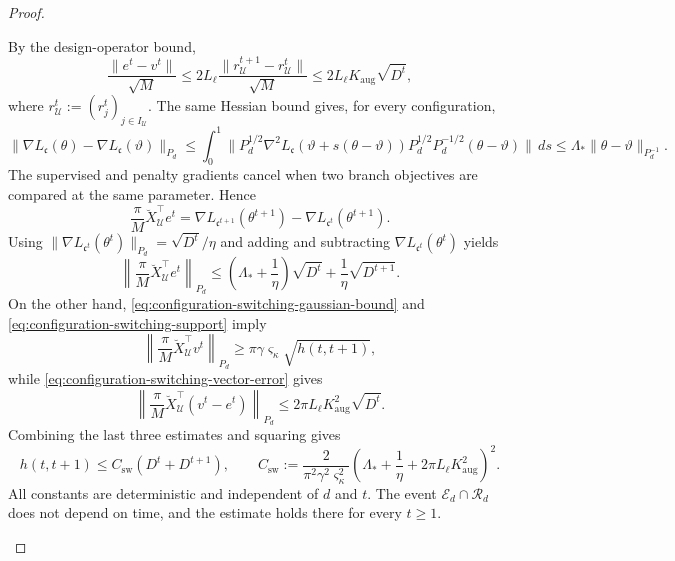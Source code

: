 \begin{proof}
\begin{itemize}[wide]
By the design-operator bound,
\begin{equation}
    \frac{\|e^t-v^t\|}{\sqrt M}
    \leq 2L_\ell
        \frac{\|r_{\mathcal U}^{t+1}-r_{\mathcal U}^t\|}{\sqrt M}
    \leq 2L_\ell K_{\mathrm{aug}}\sqrt{D^t},
    \label{eq:configuration-switching-vector-error}
\end{equation}
where $r_{\mathcal U}^t:=(r_j^t)_{j\in I_{\mathcal U}}$.
The same Hessian bound gives, for every configuration,
\[
    \|\nabla L_{\mathfrak c}(\theta)
          -\nabla L_{\mathfrak c}(\vartheta)\|_{P_d} \leq \int_0^1  \| P_d^{1/2} \nabla^2 L_{\mathfrak c}(\vartheta + s(\theta - \vartheta)) P_d^{1/2} P_d^{-1/2} (\theta - \vartheta) \| \, ds
    \leq\Lambda_*\|\theta-\vartheta\|_{P_d^{-1}}.
\]
The supervised and penalty gradients cancel when two branch
objectives are compared at the same parameter. Hence
\[
    \frac\pi M\breve X_{\mathcal U}^{\top}e^t
    =\nabla L_{\mathfrak c^{t+1}}(\theta^{t+1})
       -\nabla L_{\mathfrak c^t}(\theta^{t+1}).
\]
Using
$\|\nabla L_{\mathfrak c^t}(\theta^t)\|_{P_d}
=\sqrt{D^t}/\eta$ and adding and subtracting
$\nabla L_{\mathfrak c^t}(\theta^t)$ yields
\begin{equation}
    \left\|\frac\pi M\breve X_{\mathcal U}^{\top}e^t\right\|_{P_d}
    \leq\left(\Lambda_*+\frac1\eta\right)\sqrt{D^t}
         +\frac1\eta\sqrt{D^{t+1}}.
    \label{eq:configuration-switching-gradient-upper}
\end{equation}
On the other hand,
\eqref{eq:configuration-switching-gaussian-bound} and
\eqref{eq:configuration-switching-support} imply
\[
    \left\|\frac\pi M\breve X_{\mathcal U}^{\top}v^t\right\|_{P_d}
    \geq\pi\gamma \varsigma_\kappa\sqrt{h(t,t+1)},
\]
while \eqref{eq:configuration-switching-vector-error} gives
\[
    \left\|\frac\pi M\breve X_{\mathcal U}^{\top}(v^t-e^t)\right\|_{P_d}
    \leq 2\pi L_\ell K_{\mathrm{aug}}^2\sqrt{D^t}.
\]
Combining the last three estimates and squaring gives
\begin{equation}
    h(t,t+1)\leq C_{\mathrm{sw}}(D^t+D^{t+1}),
    \qquad
    C_{\mathrm{sw}}
    :=\frac{2}{\pi^2\gamma^2\varsigma_\kappa^2}
       \left(\Lambda_*+\frac1\eta
                         +2\pi L_\ell K_{\mathrm{aug}}^2\right)^2.
    \label{eq:configuration-switching-bound}
\end{equation}
All constants are deterministic and independent of $d$ and $t$.
The event $\mathcal E_d\cap\mathcal R_d$ does not depend on
time, and the estimate holds there for every $t\geq1$.


\end{itemize}
\end{proof}
